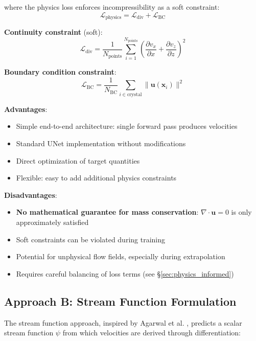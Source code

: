 where the physics loss enforces incompressibility as a soft constraint:
\begin{equation}
\mathcal{L}_{\text{physics}} = \mathcal{L}_{\text{div}} + \mathcal{L}_{\text{BC}}
\end{equation}

\textbf{Continuity constraint} (soft):
\begin{equation}
\mathcal{L}_{\text{div}} = \frac{1}{N_{\text{points}}} \sum_{i=1}^{N_{\text{points}}} \left(\frac{\partial v_x}{\partial x} + \frac{\partial v_z}{\partial z}\right)^2
\end{equation}

\textbf{Boundary condition constraint}:
\begin{equation}
\mathcal{L}_{\text{BC}} = \frac{1}{N_{\text{BC}}} \sum_{i \in \text{crystal}} \|\mathbf{u}(\mathbf{x}_i)\|^2
\end{equation}

\textbf{Advantages}:
\begin{itemize}
    \item Simple end-to-end architecture: single forward pass produces velocities
    \item Standard UNet implementation without modifications
    \item Direct optimization of target quantities
    \item Flexible: easy to add additional physics constraints
\end{itemize}

\textbf{Disadvantages}:
\begin{itemize}
    \item \textbf{No mathematical guarantee for mass conservation}: $\nabla \cdot \mathbf{u} = 0$ is only approximately satisfied
    \item Soft constraints can be violated during training
    \item Potential for unphysical flow fields, especially during extrapolation
    \item Requires careful balancing of loss terms (see \S\ref{sec:physics_informed})
\end{itemize}

\subsection{Approach B: Stream Function Formulation}
\label{sec:stream_function}

The stream function approach, inspired by Agarwal et al. \cite{agarwal2022}, predicts a scalar stream function $\psi$ from which velocities are derived through differentiation:

